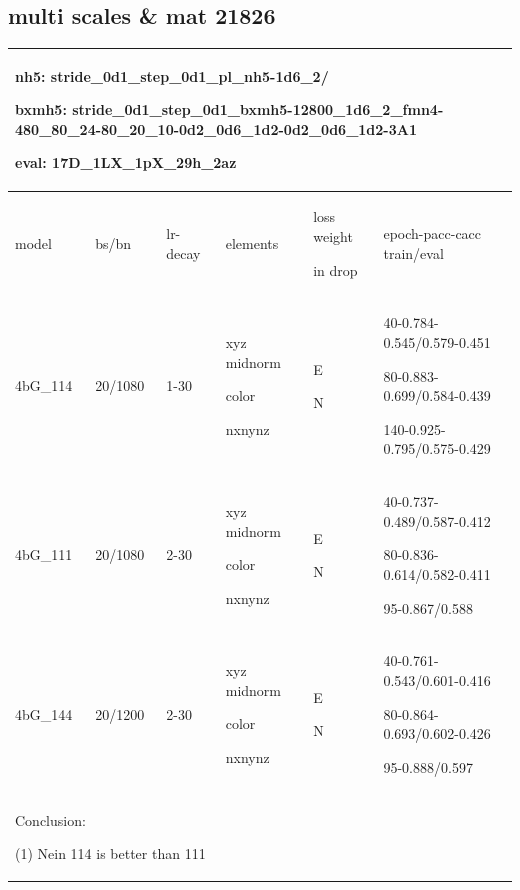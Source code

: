 \documentclass{article}
\begin{document}
\subsection{multi scales \& mat 21826}
\begin{tabular}{|p{1.5cm}|p{1.5cm}|p{1cm}|p{2cm}|p{1.5cm}|p{6cm}| }
	\hline
	\multicolumn{6}{|p{12cm}|}{nh5: stride\_0d1\_step\_0d1\_pl\_nh5-1d6\_2/ \par bxmh5:  stride\_0d1\_step\_0d1\_bxmh5-12800\_1d6\_2\_fmn4-480\_80\_24-80\_20\_10-0d2\_0d6\_1d2-0d2\_0d6\_1d2-3A1 \par eval: 17D\_1LX\_1pX\_29h\_2az } \\
	\hline
	model & bs/bn& lr-decay & elements & loss weight\par in drop & epoch-pacc-cacc train/eval \\
	\hline
	4bG\_114 & 20/1080 &1-30 & xyz midnorm\par color\par nxnynz & E\par N &40-0.784-0.545/0.579-0.451 \par 80-0.883-0.699/0.584-0.439 \par 140-0.925-0.795/0.575-0.429 \\
	\hline
	4bG\_111 & 20/1080 &2-30 & xyz midnorm\par color\par nxnynz & E\par N &40-0.737-0.489/0.587-0.412\par 80-0.836-0.614/0.582-0.411 \par 95-0.867/0.588 \\
	\hline 
	4bG\_144 & 20/1200 &2-30 & xyz midnorm\par color\par nxnynz & E\par N &40-0.761-0.543/0.601-0.416\par 80-0.864-0.693/0.602-0.426 \par 95-0.888/0.597 \\
	\hline
	 
	\multicolumn{6}{|p{12cm}|}{ Conclusion:\par	(1) Nein 114 is better than 111  } \\
	\hline
\end{tabular}	
\end{document}
